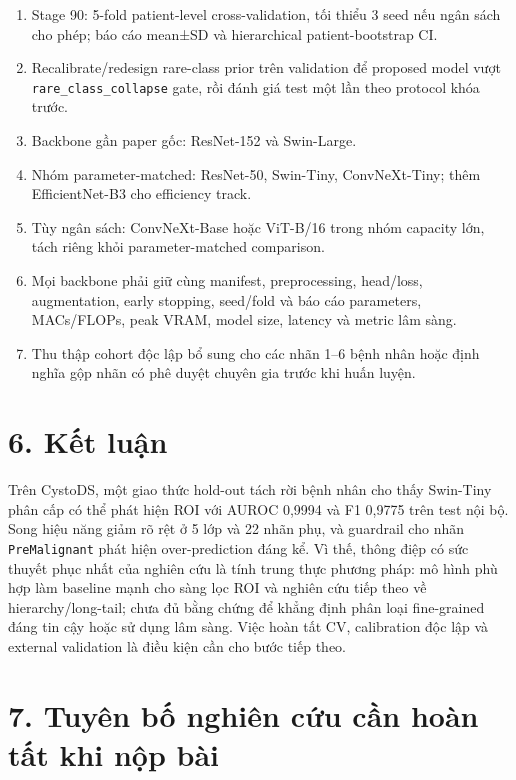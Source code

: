 \documentclass[
  10pt,
  a4paper,
  twocolumn]{article}
\providecommand{\tightlist}{%
  \setlength{\itemsep}{0pt}\setlength{\parskip}{0pt}}
\begin{document}
\begin{enumerate}
\def\labelenumi{\arabic{enumi}.}
\tightlist
\item
  Stage 90: 5-fold patient-level cross-validation, tối thiểu 3 seed nếu
  ngân sách cho phép; báo cáo mean±SD và hierarchical patient-bootstrap
  CI.
\item
  Recalibrate/redesign rare-class prior trên validation để proposed
  model vượt \texttt{rare\_class\_collapse} gate, rồi đánh giá test một
  lần theo protocol khóa trước.
\item
  Backbone gần paper gốc: ResNet-152 và Swin-Large.
\item
  Nhóm parameter-matched: ResNet-50, Swin-Tiny, ConvNeXt-Tiny; thêm
  EfficientNet-B3 cho efficiency track.
\item
  Tùy ngân sách: ConvNeXt-Base hoặc ViT-B/16 trong nhóm capacity lớn,
  tách riêng khỏi parameter-matched comparison.
\item
  Mọi backbone phải giữ cùng manifest, preprocessing, head/loss,
  augmentation, early stopping, seed/fold và báo cáo parameters,
  MACs/FLOPs, peak VRAM, model size, latency và metric lâm sàng.
\item
  Thu thập cohort độc lập bổ sung cho các nhãn 1--6 bệnh nhân hoặc định
  nghĩa gộp nhãn có phê duyệt chuyên gia trước khi huấn luyện.
\end{enumerate}

\section{6. Kết luận}\label{kux1ebft-luux1eadn}

Trên CystoDS, một giao thức hold-out tách rời bệnh nhân cho thấy
Swin-Tiny phân cấp có thể phát hiện ROI với AUROC 0,9994 và F1 0,9775
trên test nội bộ. Song hiệu năng giảm rõ rệt ở 5 lớp và 22 nhãn phụ, và
guardrail cho nhãn \texttt{PreMalignant} phát hiện over-prediction đáng
kể. Vì thế, thông điệp có sức thuyết phục nhất của nghiên cứu là tính
trung thực phương pháp: mô hình phù hợp làm baseline mạnh cho sàng lọc
ROI và nghiên cứu tiếp theo về hierarchy/long-tail; chưa đủ bằng chứng
để khẳng định phân loại fine-grained đáng tin cậy hoặc sử dụng lâm sàng.
Việc hoàn tất CV, calibration độc lập và external validation là điều
kiện cần cho bước tiếp theo.

\section{7. Tuyên bố nghiên cứu cần hoàn tất khi nộp
bài}\label{tuyuxean-bux1ed1-nghiuxean-cux1ee9u-cux1ea7n-houxe0n-tux1ea5t-khi-nux1ed9p-buxe0i}
\end{document}
